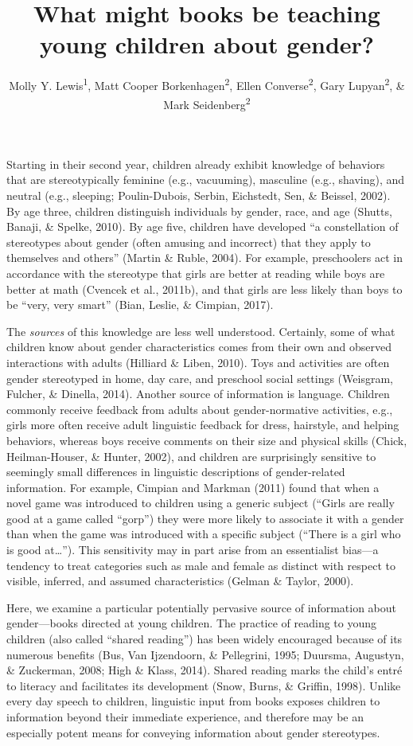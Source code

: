 \documentclass[english,,man,floatsintext]{apa6}
\title{What might books be teaching young children about gender?}
\author{Molly Y. Lewis\textsuperscript{1}, Matt Cooper Borkenhagen\textsuperscript{2}, Ellen Converse\textsuperscript{2}, Gary Lupyan\textsuperscript{2}, \& Mark Seidenberg\textsuperscript{2}}
\date{}
\affiliation{
\vspace{0.5cm}
\textsuperscript{1} Department of Psychology, Carnegie Mellon University\\\textsuperscript{2} Department of Psychology, University of Wisconsin, Madison}
\begin{document}
\maketitle

Starting in their second year, children already exhibit knowledge of behaviors that are stereotypically feminine (e.g., vacuuming), masculine (e.g., shaving), and neutral (e.g., sleeping; Poulin-Dubois, Serbin, Eichstedt, Sen, \& Beissel, 2002). By age three, children distinguish individuals by gender, race, and age (Shutts, Banaji, \& Spelke, 2010). By age five, children have developed \enquote{a constellation of stereotypes about gender (often amusing and incorrect) that they apply to themselves and others} (Martin \& Ruble, 2004). For example, preschoolers act in accordance with the stereotype that girls are better at reading while boys are better at math (Cvencek et al., 2011b), and that girls are less likely than boys to be \enquote{very, very smart} (Bian, Leslie, \& Cimpian, 2017).

The \emph{sources} of this knowledge are less well understood. Certainly, some of what children know about gender characteristics comes from their own and observed interactions with adults (Hilliard \& Liben, 2010). Toys and activities are often gender stereotyped in home, day care, and preschool social settings (Weisgram, Fulcher, \& Dinella, 2014). Another source of information is language. Children commonly receive feedback from adults about gender-normative activities, e.g., girls more often receive adult linguistic feedback for dress, hairstyle, and helping behaviors, whereas boys receive comments on their size and physical skills (Chick, Heilman-Houser, \& Hunter, 2002), and children are surprisingly sensitive to seemingly small differences in linguistic descriptions of gender-related information. For example, Cimpian and Markman (2011) found that when a novel game was introduced to children using a generic subject (\enquote{Girls are really good at a game called ``gorp}) they were more likely to associate it with a gender than when the game was introduced with a specific subject (\enquote{There is a girl who is good at\ldots{}}). This sensitivity may in part arise from an essentialist bias---a tendency to treat categories such as male and female as distinct with respect to visible, inferred, and assumed characteristics (Gelman \& Taylor, 2000).

Here, we examine a particular potentially pervasive source of information about gender---books directed at young children. The practice of reading to young children (also called \enquote{shared reading}) has been widely encouraged because of its numerous benefits (Bus, Van Ijzendoorn, \& Pellegrini, 1995; Duursma, Augustyn, \& Zuckerman, 2008; High \& Klass, 2014). Shared reading marks the child's entré to literacy and facilitates its development (Snow, Burns, \& Griffin, 1998). Unlike every day speech to children, linguistic input from books exposes children to information beyond their immediate experience, and therefore may be an especially potent means for conveying information about gender stereotypes.
\end{document}
